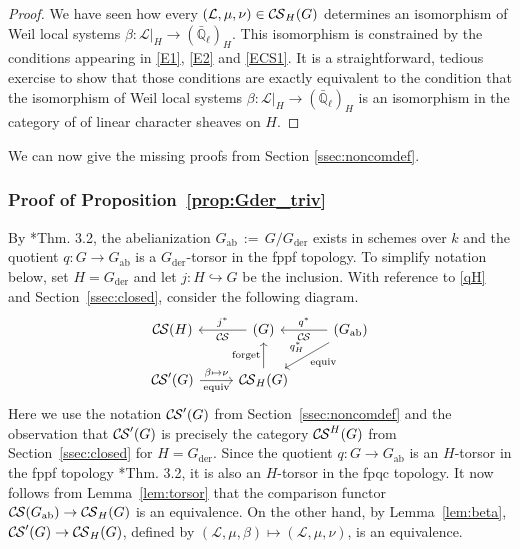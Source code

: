 \documentclass[10pt]{amsart}
\theoremstyle{plain}
\theoremstyle{definition}
\newcommand{\EE}{\mathbb{\bar Q}_\ell}
\newcommand{\Fq}{k}
\newcommand{\der}{_{\operatorname{der}}}
\newcommand{\ab}{_{\operatorname{ab}}}
\newcommand{\ceq}{{\, :=\, }}
\newcommand{\cs}[1]{{\mathcal{#1}}}
\newcommand{\CS}{{\mathcal{C\hskip-0.8pt S}}}
\begin{document}
\begin{proof}
We have seen how every $(\cs{L},\mu,\nu)\in \CS_H(G)$ determines an isomorphism of Weil local systems $\beta : \cs{L}\vert_{H} \to (\EE)_{H}$.
This isomorphism is constrained by the conditions 
appearing in \eqref{E1}, \eqref{E2} and \eqref{ECS1}.
It is a straightforward, tedious exercise to show that those conditions are exactly equivalent to the condition
that the isomorphism of Weil local systems $\beta : \cs{L}\vert_{H} \to (\EE)_{H}$ is an isomorphism in the category of of linear character sheaves on $H$.
\end{proof}


We can now give the missing proofs from Section \ref{ssec:noncomdef}.

\subsubsection{Proof of Proposition~\ref{prop:Gder_triv}}\label{ssec:proof1}

By \cite{demazure:SGA3-VIA}*{Thm. 3.2}, the abelianization $G\ab\ceq G/G\der$ exists in schemes over $\Fq$ and the quotient $q: G \to G\ab$ is a $G\der$-torsor in the fppf topology.
%
To simplify notation below, set $H=G\der$
and let $j : H\hookrightarrow G$ be the inclusion. 
With reference to \eqref{qH} and Section~\ref{ssec:closed}, consider the following diagram.
\[
\begin{tikzcd}
\CS(H) & \arrow{l}[swap]{j^*} \CS(G) &\arrow{l}[swap]{q^*} 
\CS(G\ab) \arrow{dl}{\text{equiv}}[swap]{q_{H}^*} \\
 \CS'(G)  \arrow{r}{\beta \mapsto \nu}[swap]{\text{equiv}} &  \CS_{H}(G) \arrow{u}{\text{forget}}  & 
\end{tikzcd}
\]
%
Here we use the notation $\CS'(G)$ from Section~\ref{ssec:noncomdef} and the observation that $\CS'(G)$ is precisely the category $\CS^{H}(G)$ from Section~\ref{ssec:closed} for $H=G\der$.
%
Since the quotient $q : G \to G\ab$ is an $H$-torsor in the fppf topology \cite{demazure:SGA3-VIA}*{Thm. 3.2}, 
it is also an $H$-torsor in the fpqc topology.
It now follows from Lemma~\ref{lem:torsor} that the comparison functor $\CS(G\ab)\to \CS_{H}(G)$ is an equivalence.
%
On the other hand, by Lemma~\ref{lem:beta}, $\CS'(G) \to \CS_{H}(G)$, defined by $(\cs{L},\mu,\beta)\mapsto (\cs{L},\mu, \nu)$, is an equivalence.
\end{document}

